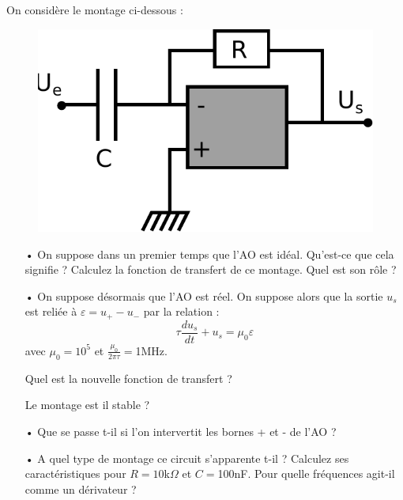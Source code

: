 \documentclass{report}
\begin{document}
On considère le montage ci-dessous :
\begin{figure}[!h]
\centering
\includegraphics[width=0.5\linewidth]{derivateur.pdf}
\end{figure}
\begin{itemize}
	\item[•] On suppose dans un premier temps que l'AO est idéal. Qu'est-ce que cela signifie ? Calculez la fonction de transfert de ce montage. Quel est son rôle ?
	\item[•] On suppose désormais que l'AO est réel. On suppose alors que la sortie $u_s$ est reliée à $\varepsilon=u_+-u_-$ par la relation :
	\begin{equation}
		\tau\frac{du_s}{dt} +u_s = \mu_0\varepsilon
	\end{equation}
	avec $\mu_0=10^5$ et $\frac{\mu_0}{2\pi\tau}=$1MHz.
	
	Quel est la nouvelle fonction de transfert ? 
	
	Le montage est il stable ?
	
	\item[•] Que se passe t-il si l'on intervertit les bornes + et - de l'AO ?
	
	\item[•] A quel type de montage ce circuit s'apparente t-il ? Calculez ses caractéristiques pour $R=10$k$\Omega$ et $C=$100nF. Pour quelle fréquences agit-il comme un dérivateur ? 
\end{itemize}
\end{document}
